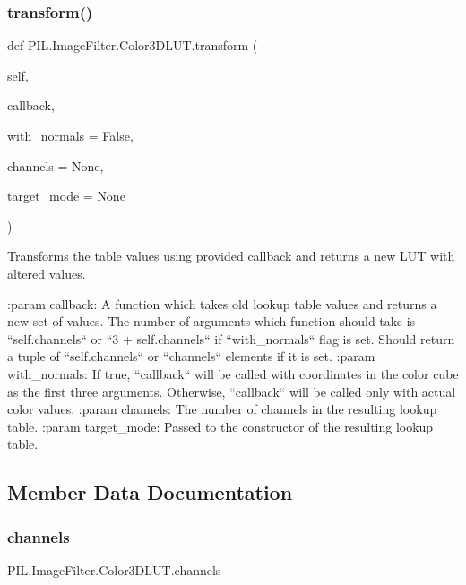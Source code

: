 \subsubsection{\texorpdfstring{transform()}{transform()}}
{\footnotesize\ttfamily def P\+I\+L.\+Image\+Filter.\+Color3\+D\+L\+U\+T.\+transform (\begin{DoxyParamCaption}\item[{}]{self,  }\item[{}]{callback,  }\item[{}]{with\+\_\+normals = {\ttfamily False},  }\item[{}]{channels = {\ttfamily None},  }\item[{}]{target\+\_\+mode = {\ttfamily None} }\end{DoxyParamCaption})}

\begin{DoxyVerb}Transforms the table values using provided callback and returns
a new LUT with altered values.

:param callback: A function which takes old lookup table values
         and returns a new set of values. The number
         of arguments which function should take is
         ``self.channels`` or ``3 + self.channels``
         if ``with_normals`` flag is set.
         Should return a tuple of ``self.channels`` or
         ``channels`` elements if it is set.
:param with_normals: If true, ``callback`` will be called with
             coordinates in the color cube as the first
             three arguments. Otherwise, ``callback``
             will be called only with actual color values.
:param channels: The number of channels in the resulting lookup table.
:param target_mode: Passed to the constructor of the resulting
            lookup table.
\end{DoxyVerb}
 

\subsection{Member Data Documentation}
\mbox{\label{classPIL_1_1ImageFilter_1_1Color3DLUT_ae16d7d5a5d629353976dd429bf672cb6}} 
\subsubsection{\texorpdfstring{channels}{channels}}
{\footnotesize\ttfamily P\+I\+L.\+Image\+Filter.\+Color3\+D\+L\+U\+T.\+channels}

